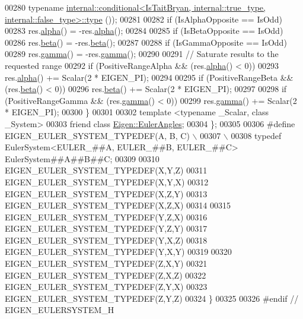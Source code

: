 \begin{DoxyCode}
00280         \textcolor{keyword}{typename} 
      \hyperlink{class_eigen_1_1internal_1_1_tensor_lazy_evaluator_writable}{internal::conditional<IsTaitBryan, internal::true\_type, internal::false\_type>::type}
      ());
00281 
00282       \textcolor{keywordflow}{if} (IsAlphaOpposite == IsOdd)
00283         res.\hyperlink{class_eigen_1_1_euler_angles_a6146f78ee0fb9d9a7d685a4654066825}{alpha}() = -res.\hyperlink{class_eigen_1_1_euler_angles_a6146f78ee0fb9d9a7d685a4654066825}{alpha}();
00284         
00285       \textcolor{keywordflow}{if} (IsBetaOpposite == IsOdd)
00286         res.\hyperlink{class_eigen_1_1_euler_angles_a1bf59f8acaed985964c98c1f59d8f5ab}{beta}() = -res.\hyperlink{class_eigen_1_1_euler_angles_a1bf59f8acaed985964c98c1f59d8f5ab}{beta}();
00287         
00288       \textcolor{keywordflow}{if} (IsGammaOpposite == IsOdd)
00289         res.\hyperlink{class_eigen_1_1_euler_angles_aa75a5f16105d96eedf81bf9f8e789e21}{gamma}() = -res.\hyperlink{class_eigen_1_1_euler_angles_aa75a5f16105d96eedf81bf9f8e789e21}{gamma}();
00290       
00291       \textcolor{comment}{// Saturate results to the requested range}
00292       \textcolor{keywordflow}{if} (PositiveRangeAlpha && (res.\hyperlink{class_eigen_1_1_euler_angles_a6146f78ee0fb9d9a7d685a4654066825}{alpha}() < 0))
00293         res.\hyperlink{class_eigen_1_1_euler_angles_a6146f78ee0fb9d9a7d685a4654066825}{alpha}() += Scalar(2 * EIGEN\_PI);
00294       
00295       \textcolor{keywordflow}{if} (PositiveRangeBeta && (res.\hyperlink{class_eigen_1_1_euler_angles_a1bf59f8acaed985964c98c1f59d8f5ab}{beta}() < 0))
00296         res.\hyperlink{class_eigen_1_1_euler_angles_a1bf59f8acaed985964c98c1f59d8f5ab}{beta}() += Scalar(2 * EIGEN\_PI);
00297       
00298       \textcolor{keywordflow}{if} (PositiveRangeGamma && (res.\hyperlink{class_eigen_1_1_euler_angles_aa75a5f16105d96eedf81bf9f8e789e21}{gamma}() < 0))
00299         res.\hyperlink{class_eigen_1_1_euler_angles_aa75a5f16105d96eedf81bf9f8e789e21}{gamma}() += Scalar(2 * EIGEN\_PI);
00300     \}
00301     
00302     \textcolor{keyword}{template} <\textcolor{keyword}{typename} \_Scalar, \textcolor{keyword}{class} \_System>
00303     \textcolor{keyword}{friend} \textcolor{keyword}{class }\hyperlink{class_eigen_1_1_euler_angles}{Eigen::EulerAngles};
00304   \};
00305 
00306 \textcolor{preprocessor}{#define EIGEN\_EULER\_SYSTEM\_TYPEDEF(A, B, C) \(\backslash\)}
00307 \textcolor{preprocessor}{ \(\backslash\)}
00308 \textcolor{preprocessor}{  typedef EulerSystem<EULER\_##A, EULER\_##B, EULER\_##C> EulerSystem##A##B##C;}
00309   
00310   EIGEN\_EULER\_SYSTEM\_TYPEDEF(X,Y,Z)
00311   EIGEN\_EULER\_SYSTEM\_TYPEDEF(X,Y,X)
00312   EIGEN\_EULER\_SYSTEM\_TYPEDEF(X,Z,Y)
00313   EIGEN\_EULER\_SYSTEM\_TYPEDEF(X,Z,X)
00314   
00315   EIGEN\_EULER\_SYSTEM\_TYPEDEF(Y,Z,X)
00316   EIGEN\_EULER\_SYSTEM\_TYPEDEF(Y,Z,Y)
00317   EIGEN\_EULER\_SYSTEM\_TYPEDEF(Y,X,Z)
00318   EIGEN\_EULER\_SYSTEM\_TYPEDEF(Y,X,Y)
00319   
00320   EIGEN\_EULER\_SYSTEM\_TYPEDEF(Z,X,Y)
00321   EIGEN\_EULER\_SYSTEM\_TYPEDEF(Z,X,Z)
00322   EIGEN\_EULER\_SYSTEM\_TYPEDEF(Z,Y,X)
00323   EIGEN\_EULER\_SYSTEM\_TYPEDEF(Z,Y,Z)
00324 \}
00325 
00326 \textcolor{preprocessor}{#endif // EIGEN\_EULERSYSTEM\_H}
\end{DoxyCode}
